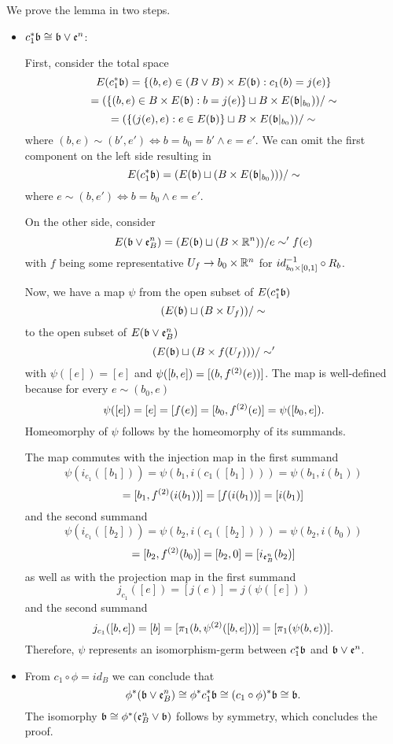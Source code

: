 \begin{myproof}
    We prove the lemma in two steps.
    \begin{itemize}
        \item $c_1^*\mathfrak{b} \cong \mathfrak{b} \vee \mathfrak{e}^{n}$:
        
        First, consider the total space
        \[ E(c_1^*\mathfrak{b}) = \{(b, e) \in (B \vee B) \times E(\mathfrak{b}):c_1(b) = j(e)\} \]
        \[ = (\{(b, e) \in B \times E(\mathfrak{b}):b = j(e)\} \sqcup B \times E(\mathfrak{b}\vert_{b_0})) / \sim \]
        \[ = (\{(j(e), e):e \in E(\mathfrak{b})\} \sqcup B \times E(\mathfrak{b}\vert_{b_0})) / \sim \]
        where $(b, e) \sim (b', e') \iff b = b_0 = b' \land e = e'$.
        We can omit the first component on the left side resulting in
        \[ E(c_1^*\mathfrak{b}) = (E(\mathfrak{b}) \sqcup (B \times E(\mathfrak{b}\vert_{b_0}))) / \sim \]
        where $e \sim (b, e') \iff b = b_0 \land e = e'$.
        
        On the other side, consider
        \[ E(\mathfrak{b} \vee \mathfrak{e}^{n}_B) = (E(\mathfrak{b}) \sqcup (B \times \mathbb{R}^n)) / e \sim' f(e) \]
        with $f$ being some representative
        $U_f \to b_0 \times \mathbb{R}^n$ for $id_{b_0 \times{} [0, 1]}^{-1} \circ R_b$.
        
        Now, we have a map $\psi$ from the open subset of $E(c_1^*\mathfrak{b})$
        \[ (E(\mathfrak{b}) \sqcup (B \times U_f)) / \sim \]
        to the open subset of $E(\mathfrak{b} \vee \mathfrak{e}^{n}_B)$
        \[ (E(\mathfrak{b}) \sqcup (B \times f(U_f))) / \sim' \]
        with $\psi([e]) = [e]$ and $\psi([b, e]) = [(b, f^{(2)}(e))]$.
        The map is well-defined because for every $e \sim (b_0, e)$
        \[ \psi([e]) = [e] = [f(e)] = [b_0, f^{(2)}(e)] = \psi([b_0, e]). \]
        Homeomorphy of $\psi$ follows by the homeomorphy of its summands.
        
        The map commutes with the injection map in the first summand
        \[ \psi(i_{c_1}([b_1])) = \psi(b_1, i(c_1([b_1]))) = \psi(b_1, i(b_1)) \]
        \[ = [b_1, f^{(2)}(i(b_1))] = [f(i(b_1))] = [i(b_1)] \]
        and the second summand
        \[ \psi(i_{c_1}([b_2])) = \psi(b_2, i(c_1([b_2]))) = \psi(b_2, i(b_0)) \]
        \[ = [b_2, f^{(2)}(b_0)] = [b_2, 0] = [i_{\mathfrak{e}^{n}_B}(b_2)] \]
        as well as with the projection map in the first summand
        \[ j_{c_1}([e]) = [j(e)] = j(\psi([e])) \]
        and the second summand
        \[ j_{c_1}([b, e]) = [b] = [\pi_1(b, \psi^{(2)}([b, e]))] = [\pi_1(\psi(b, e))]. \]
        Therefore, $\psi$ represents an isomorphism-germ between $c_1^*\mathfrak{b}$ and $\mathfrak{b} \vee \mathfrak{e}^{n}$.
    
        \item From $c_1 \circ \phi = id_B$ we can conclude that
        \[ \phi^*(\mathfrak{b} \vee \mathfrak{e}^{n}_B) \cong \phi^*c_1^*\mathfrak{b} \cong (c_1 \circ \phi)^*\mathfrak{b} \cong \mathfrak{b}. \]
        The isomorphy $\mathfrak{b} \cong \phi^*(\mathfrak{e}^{n}_B \vee \mathfrak{b})$ follows by symmetry,
        which concludes the proof.
    \end{itemize}
\end{myproof}

